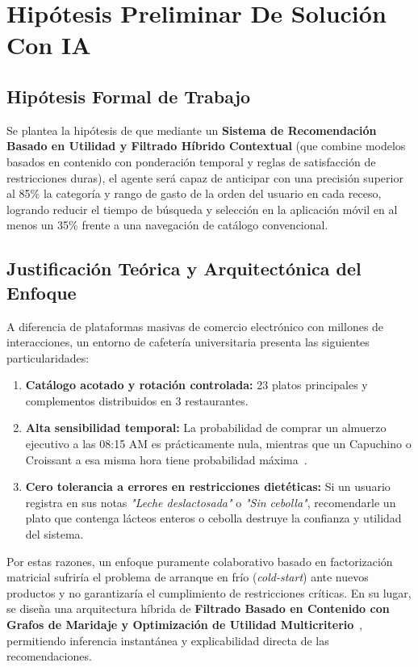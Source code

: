 \documentclass{article}
\begin{document}
\section{Hipótesis Preliminar De Solución Con IA}

\subsection{Hipótesis Formal de Trabajo}

Se plantea la hipótesis de que mediante un \textbf{Sistema de Recomendación Basado en Utilidad y Filtrado Híbrido Contextual} (que combine modelos basados en contenido con ponderación temporal y reglas de satisfacción de restricciones duras), el agente será capaz de anticipar con una precisión superior al 85\% la categoría y rango de gasto de la orden del usuario en cada receso, logrando reducir el tiempo de búsqueda y selección en la aplicación móvil en al menos un 35\% frente a una navegación de catálogo convencional.

\subsection{Justificación Teórica y Arquitectónica del Enfoque}

A diferencia de plataformas masivas de comercio electrónico con millones de interacciones, un entorno de cafetería universitaria presenta las siguientes particularidades:
\begin{enumerate}
    \item \textbf{Catálogo acotado y rotación controlada:} 23 platos principales y complementos distribuidos en 3 restaurantes.
    \item \textbf{Alta sensibilidad temporal:} La probabilidad de comprar un almuerzo ejecutivo a las 08:15 AM es prácticamente nula, mientras que un Capuchino o Croissant a esa misma hora tiene probabilidad máxima~\cite{adomavicius2011context}.
    \item \textbf{Cero tolerancia a errores en restricciones dietéticas:} Si un usuario registra en sus notas \textit{"Leche deslactosada"} o \textit{"Sin cebolla"}, recomendarle un plato que contenga lácteos enteros o cebolla destruye la confianza y utilidad del sistema.
\end{enumerate}

Por estas razones, un enfoque puramente colaborativo basado en factorización matricial sufriría el problema de arranque en frío (\textit{cold-start}) ante nuevos productos y no garantizaría el cumplimiento de restricciones críticas. En su lugar, se diseña una arquitectura híbrida de \textbf{Filtrado Basado en Contenido con Grafos de Maridaje y Optimización de Utilidad Multicriterio}~\cite{lops2011content,burke2002hybrid}, permitiendo inferencia instantánea y explicabilidad directa de las recomendaciones.
\end{document}
